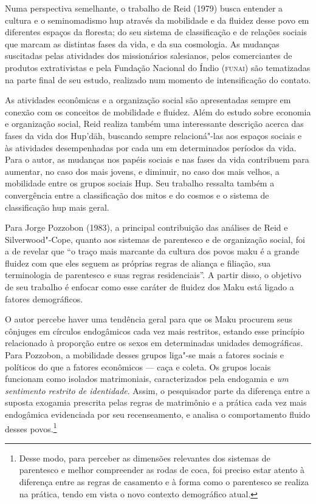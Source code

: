 Numa perspectiva semelhante, o trabalho de Reid (1979) busca entender a
cultura e o seminomadismo hup através da mobilidade e da fluidez desse
povo em diferentes espaços da floresta; do seu sistema de classificação
e de relações sociais que marcam as distintas fases da vida, e da sua
cosmologia. As mudanças suscitadas pelas atividades dos missionários
salesianos, pelos comerciantes de produtos extrativistas e pela Fundação
Nacional do Índio (\textsc{funai}) são tematizadas na parte final de seu estudo,
realizado num momento de intensificação do contato.

As atividades econômicas e a organização social são apresentadas sempre
em conexão com os conceitos de mobilidade e fluidez. Além do estudo
sobre economia e organização social, Reid realiza também uma
interessante descrição acerca das fases da vida dos Hup'däh, buscando
sempre relacioná"-las aos espaços sociais e às atividades desempenhadas
por cada um em determinados períodos da vida. Para o autor, as mudanças
nos papéis sociais e nas fases da vida contribuem para aumentar, no caso
dos mais jovens, e diminuir, no caso dos mais velhos, a mobilidade entre
os grupos sociais Hup. Seu trabalho ressalta também a convergência entre
a classificação dos mitos e do cosmos e o sistema de classificação hup
mais geral.

Para Jorge Pozzobon (1983), a principal contribuição das análises de
Reid e Silverwood"-Cope, quanto aos sistemas de parentesco e de
organização social, foi a de revelar que ``o traço mais marcante da
cultura dos povos maku é a grande fluidez com que eles seguem as
próprias regras de aliança e filiação, sua terminologia de parentesco e
suas regras residenciais''. A partir disso, o objetivo de seu trabalho é
enfocar como esse caráter de fluidez dos Maku está ligado a fatores
demográficos.

O autor percebe haver uma tendência geral para que os Maku procurem seus
cônjuges em círculos endogâmicos cada vez mais restritos, estando esse
princípio relacionado à proporção entre os sexos em determinadas
unidades demográficas. Para Pozzobon, a mobilidade desses grupos liga"-se
mais a fatores sociais e políticos do que a fatores econômicos --- caça e
coleta. Os grupos locais funcionam como isolados matrimoniais,
caracterizados pela endogamia e \textit{um sentimento restrito de
identidade}. Assim, o pesquisador parte da diferença entre a suposta
exogamia prescrita pelas regras de matrimônio e a prática cada vez mais
endogâmica evidenciada por seu recenseamento, e analisa o comportamento
fluido desses povos.\footnote{Desse modo, para perceber as dimensões
  relevantes dos sistemas de parentesco e melhor compreender as rodas de
  coca, foi preciso estar atento à diferença entre as regras de
  casamento e à forma como o parentesco se realiza na prática, tendo em
  vista o novo contexto demográfico atual.}

